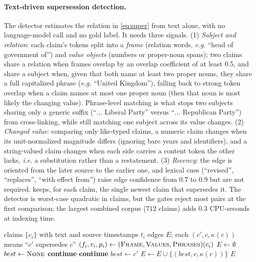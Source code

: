 \documentclass[letterpaper]{article}
\theoremstyle{plain}
\newcommand{\eg}{\emph{e.g.}}
\newcommand{\ie}{\emph{i.e.}}
\begin{document}
\paragraph{Text-driven supersession detection.} The detector estimates the relation in \cref{eq:super} from text alone, with no language-model call and no gold label. It needs three signals. (1) \emph{Subject and relation}: each claim's tokens split into a \emph{frame} (relation words, \eg{} ``head of government of'') and \emph{value objects} (numbers or proper-noun spans); two claims share a relation when frames overlap by an overlap coefficient of at least $0.5$, and share a subject when, given that both name at least two proper nouns, they share a full capitalized phrase (\eg{} ``United Kingdom''), falling back to strong token overlap when a claim names at most one proper noun (then that noun is most likely the changing value). Phrase-level matching is what stops two subjects sharing only a generic suffix (``$\dots$ Liberal Party'' versus ``$\dots$ Republican Party'') from cross-linking, while still matching one subject across its value changes. (2) \emph{Changed value}: comparing only like-typed claims, a numeric claim changes when its unit-normalized magnitude differs (ignoring bare years and identifiers), and a string-valued claim changes when each side carries a content token the other lacks, \ie{} a substitution rather than a restatement. (3) \emph{Recency}: the edge is oriented from the later source to the earlier one, and lexical cues (``revised'', ``replaces'', ``with effect from'') raise edge confidence from $0.7$ to $0.9$ but are not required.  keeps, for each claim, the single newest claim that supersedes it. The detector is worst-case quadratic in claims, but the gates reject most pairs at the first comparison; the largest combined corpus ($712$ claims) adds $0.3$ CPU-seconds at indexing time.

\begin{algorithm}[t]
\caption{Text-driven supersession detection}\label{alg:supersession}
\begin{algorithmic}[1]
\Require claims $\{c_i\}$ with text and source timestamps $t_i$
\Ensure edges $E$; each $(c',c,\kappa(c))$ means ``$c'$ supersedes $c$''
  \State $(f_i,v_i,p_i)\gets(\textsc{Frame},\textsc{Values},\textsc{Phrases})(c_i)$
\EndFor
\State $E\gets\emptyset$
  \State $best\gets\textsc{None}$
     \textbf{continue} \EndIf
     \textbf{continue} \EndIf
     $best\gets c'$ \EndIf
  \EndFor
   $E\gets E\cup\{(best,c,\kappa(c))\}$ \EndIf
\EndFor
\State \Return $E$
\end{algorithmic}
\end{algorithm}
\end{document}
